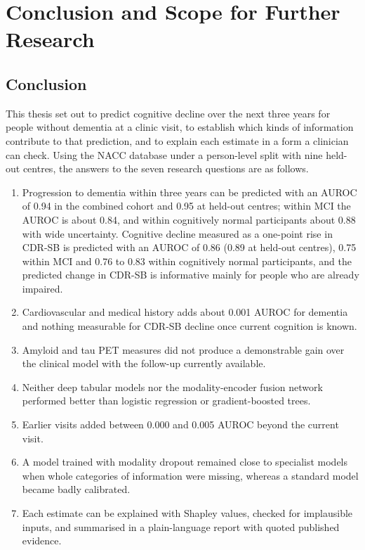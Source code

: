 \chapter{Conclusion and Scope for Further Research}
\label{ch:conclusion}

\section{Conclusion}

This thesis set out to predict cognitive decline over the next three years for people without dementia at a clinic visit, to establish which kinds of information contribute to that prediction, and to explain each estimate in a form a clinician can check. Using the NACC database under a person-level split with nine held-out centres, the answers to the seven research questions are as follows.

\begin{enumerate}[label=\textbf{RQ\arabic*.},leftmargin=*]
\item Progression to dementia within three years can be predicted with an AUROC of 0.94 in the combined cohort and 0.95 at held-out centres; within MCI the AUROC is about 0.84, and within cognitively normal participants about 0.88 with wide uncertainty. Cognitive decline measured as a one-point rise in CDR-SB is predicted with an AUROC of 0.86 (0.89 at held-out centres), 0.75 within MCI and 0.76 to 0.83 within cognitively normal participants, and the predicted change in CDR-SB is informative mainly for people who are already impaired.
\item Cardiovascular and medical history adds about 0.001 AUROC for dementia and nothing measurable for CDR-SB decline once current cognition is known.
\item Amyloid and tau PET measures did not produce a demonstrable gain over the clinical model with the follow-up currently available.
\item Neither deep tabular models nor the modality-encoder fusion network performed better than logistic regression or gradient-boosted trees.
\item Earlier visits added between 0.000 and 0.005 AUROC beyond the current visit.
\item A model trained with modality dropout remained close to specialist models when whole categories of information were missing, whereas a standard model became badly calibrated.
\item Each estimate can be explained with Shapley values, checked for implausible inputs, and summarised in a plain-language report with quoted published evidence.
\end{enumerate}

